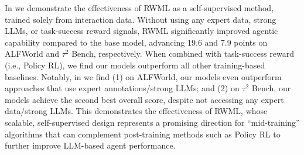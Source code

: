 \documentclass{article}
\theoremstyle{plain}
\theoremstyle{definition}
\theoremstyle{remark}
\newcommand{\ie}{i.e.,}
\newcommand{\policyrl}[0]{Policy RL}
\newcommand{\shortmethod}[0]{RWML}
\newcommand{\wmrlshort}[0]{\shortmethod}
\begin{document}
In  we demonstrate the effectiveness of \wmrlshort{} as a self-supervised method, trained solely from interaction data.
Without using any expert data, strong LLMs, or task-success reward signals, \wmrlshort{} significantly improved agentic capability compared to the base model, advancing 19.6 and 7.9 points on ALFWorld and $\tau^2$ Bench, respectively.
When combined with task-success reward (\ie{} \policyrl{}), we find our models outperform all other training-based baselines.
Notably, in  we find (1) on ALFWorld, our models even outperform approaches that use expert annotations/strong LLMs; and (2) on $\tau^2$ Bench, our models achieve the second best overall score, despite not accessing any expert data/strong LLMs.
This demonstrates the effectiveness of \wmrlshort{}, whose scalable, self-supervised design represents a promising direction for ``mid-training'' algorithms that can complement post-training methods such as \policyrl{} to further improve LLM-based agent performance.
\end{document}
